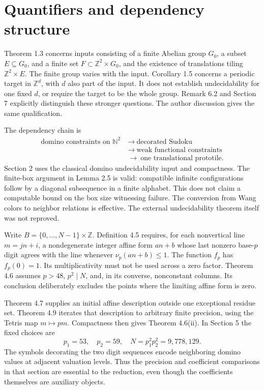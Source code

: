 \documentclass[10pt]{article}
\begin{document}
\section*{Quantifiers and dependency structure}
Theorem 1.3 concerns inputs consisting of a finite Abelian group \(G_0\), a subset \(E\subseteq G_0\), and a finite set \(F\subset\mathbb Z^2\times G_0\), and the existence of translations tiling \(\mathbb Z^2\times E\). The finite group varies with the input. Corollary 1.5 concerns a periodic target in \(\mathbb Z^d\), with \(d\) also part of the input. It does not establish undecidability for one fixed \(d\), or require the target to be the whole group. Remark 6.2 and Section 7 explicitly distinguish these stronger questions. The author discussion gives the same qualification.\par
The dependency chain is \[\begin{aligned}
 \text{domino constraints on }\mathbb N^2
 &\ \longrightarrow\ \text{decorated Sudoku}\\
 &\ \longrightarrow\ \text{weak functional constraints}\\
 &\ \longrightarrow\ \text{one translational prototile}.
\end{aligned}\] Section 2 uses the classical domino undecidability input and compactness. The finite-box argument in Lemma 2.5 is valid: compatible infinite configurations follow by a diagonal subsequence in a finite alphabet. This does not claim a computable bound on the box size witnessing failure. The conversion from Wang colors to neighbor relations is effective. The external undecidability theorem itself was not reproved.\par
Write \(B=\{0,\ldots,N-1\}\times\mathbb Z\). Definition 4.5 requires, for each nonvertical line \(m=jn+i\), a nondegenerate integer affine form \(an+b\) whose last nonzero base-\(p\) digit agrees with the line whenever \(\nu_p(an+b)\le1\). The function \(f_p\) has \(f_p(0)=1\). Its multiplicativity must not be used across a zero factor. Theorem 4.6 assumes \(p>48\), \(p^2\mid N\), and, in its converse, nonconstant columns. Its conclusion deliberately excludes the points where the limiting affine form is zero.\par
Theorem 4.7 supplies an initial affine description outside one exceptional residue set. Theorem 4.9 iterates that description to arbitrary finite precision, using the Tetris map \(m\mapsto pm\). Compactness then gives Theorem 4.6(ii). In Section 5 the fixed choices are \[p_1=53,\quad p_2=59,\quad N=p_1^2p_2^2=9,778,129.\] The symbols decorating the two digit sequences encode neighboring domino values at adjacent valuation levels. Thus the precision and coefficient comparisons in that section are essential to the reduction, even though the coefficients themselves are auxiliary objects.\par
\end{document}
